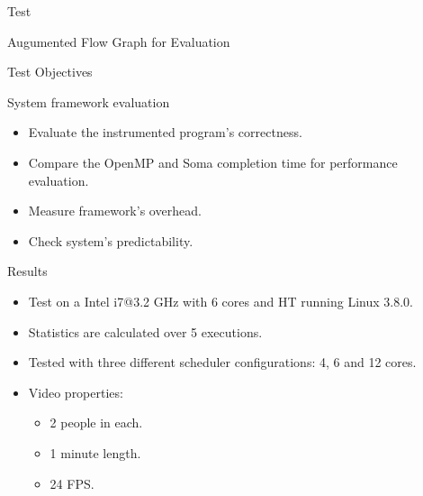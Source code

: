 \documentclass[xcolor=dvipsnames]{beamer}
\begin{document}
\begin{section}{Test}
\begin{frame}{\hskip 0.3cm Augumented Flow Graph for Evaluation}
\end{frame}











\begin{frame}{\hskip 0.3cm Test Objectives}


System framework evaluation

\begin{itemize}

\item Evaluate the instrumented program's correctness.

\item Compare the OpenMP and Soma completion time for performance evaluation.

\item Measure framework's overhead.

\item Check system's predictability.

\end{itemize}




\end{frame}







\begin{frame}{\hskip 0.3cm Results}
\vskip -1cm
\begin{itemize}

\item Test on a Intel i7@3.2 GHz with 6 cores and HT running Linux 3.8.0.

\item Statistics are calculated over 5 executions.

\item Tested with three different scheduler configurations: 4, 6 and 12 cores.

\item Video properties:

\begin{itemize}

\item 2 people in each.

\item 1 minute length.

\item 24 FPS.


\end{itemize}
\end{itemize}
\end{frame}
\end{section}
\end{document}
